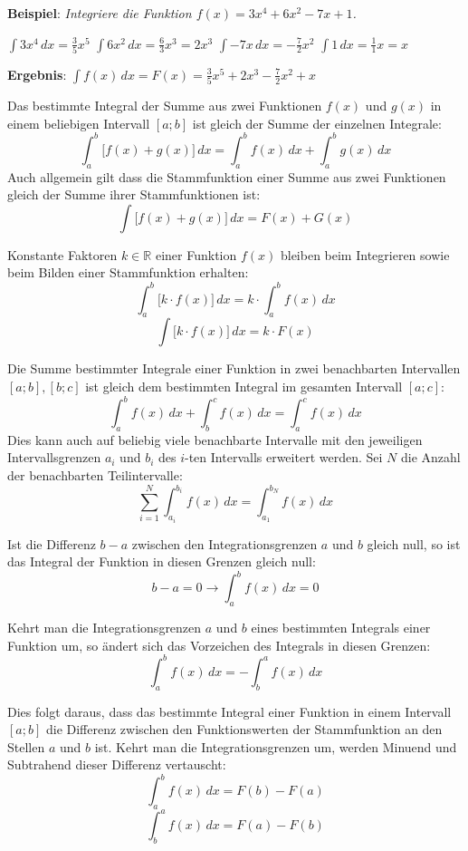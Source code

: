 \textbf{Beispiel}: \emph{Integriere die Funktion $f(x) = 3x^4 + 6x^2 -7x + 1$.}

\begin{center}
	$\int 3x^4 \, dx = \frac{3}{5}x^5$ \hspace{1cm} $\int 6x^2 \, dx = \frac{6}{3}x^3 = 2x^3$ \hspace{1cm} $\int -7x \, dx = -\frac{7}{2}x^2$ \hspace{1cm} $\int 1 \, dx = \frac{1}{1}x = x$
\end{center}

\textbf{Ergebnis}: $\int f(x) \, dx = F(x) = \frac{3}{5}x^5 + 2x^3 -\frac{7}{2}x^2 + x$

\begin{itemize}

	Das bestimmte Integral der Summe aus zwei Funktionen $f(x)$ und $g(x)$ in einem beliebigen Intervall $[a ; b]$ ist gleich der Summe der einzelnen Integrale: $$\int_a^b \big[f(x) + g(x)\big] \,dx = \int_a^b f(x) \, dx + \int_a^b g(x) \, dx$$ Auch allgemein gilt dass die Stammfunktion einer Summe aus zwei Funktionen gleich der Summe ihrer Stammfunktionen ist: $$\int \big[f(x) + g(x)\big]\,dx = F(x) + G(x)$$


	Konstante Faktoren $k \in \mathbb{R}$ einer Funktion $f(x)$ bleiben beim Integrieren sowie beim Bilden einer Stammfunktion erhalten: $$\int_a^b \big[k \cdot f(x)\big] \, dx = k \cdot \int_a^b f(x) \, dx$$ $$\int \big[k \cdot f(x)\big] \, dx = k \cdot F(x)$$


	Die Summe bestimmter Integrale einer Funktion in zwei benachbarten Intervallen $[a ; b], [b ; c]$ ist gleich dem bestimmten Integral im gesamten Intervall $[a ; c]$: $$\int_a^b f(x) \, dx + \int_b^c f(x) \, dx = \int_a^c f(x)\, dx$$ Dies kann auch auf beliebig viele benachbarte Intervalle mit den jeweiligen Intervallsgrenzen $a_i$ und $b_i$ des $i$-ten Intervalls erweitert werden. Sei $N$ die Anzahl der benachbarten Teilintervalle: $$\sum_{i=1}^{N} \int_{a_i}^{b_i} f(x) \, dx = \int_{a_1}^{b_N} f(x) \, dx$$


	Ist die Differenz $b - a$ zwischen den Integrationsgrenzen $a$ und $b$ gleich null, so ist das Integral der Funktion in diesen Grenzen gleich null: $$b - a = 0 \rightarrow \int_{a}^{b} f(x) \, dx = 0$$


	Kehrt man die Integrationsgrenzen $a$ und $b$ eines bestimmten Integrals einer Funktion um, so \"{a}ndert sich das Vorzeichen des Integrals in diesen Grenzen: $$\int_a^b f(x) \, dx = -\int_b^a f(x) \, dx$$

	Dies folgt daraus, dass das bestimmte Integral einer Funktion in einem Intervall $[a ; b]$ die Differenz zwischen den Funktionswerten der Stammfunktion an den Stellen $a$ und $b$ ist. Kehrt man die Integrationsgrenzen um, werden Minuend und Subtrahend dieser Differenz vertauscht: $$\int_a^b f(x) \, dx = F(b) - F(a)$$ $$\int_b^a f(x) \, dx = F(a) - F(b)$$

\end{itemize}

